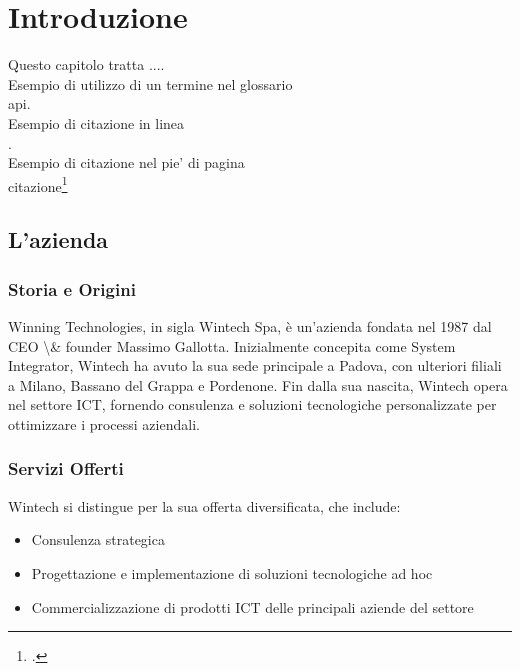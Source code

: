 \chapter{Introduzione}
\label{cap:introduzione}

Questo capitolo tratta ....\\

\noindent Esempio di utilizzo di un termine nel glossario \\
\gls{api}. \\

\noindent Esempio di citazione in linea \\
\cite{site:agile-manifesto}. \\

\noindent Esempio di citazione nel pie' di pagina \\
citazione\footcite{womak:lean-thinking} \\

\section{L'azienda}

\subsection{Storia e Origini}
Winning Technologies, in sigla Wintech Spa, è un'azienda fondata nel 1987 dal \gls{CEO \& founder} Massimo Gallotta. Inizialmente concepita come \gls{System Integrator}, Wintech ha avuto la sua sede principale a Padova, con ulteriori filiali a Milano, Bassano del Grappa e Pordenone. 
Fin dalla sua nascita, Wintech opera nel settore ICT, fornendo consulenza e soluzioni tecnologiche personalizzate per ottimizzare i processi aziendali.

\subsection{Servizi Offerti}
Wintech si distingue per la sua offerta diversificata, che include:

\begin{itemize}
    \item Consulenza strategica
    \item Progettazione e implementazione di soluzioni tecnologiche ad hoc
    \item Commercializzazione di prodotti ICT delle principali aziende del settore
\end{itemize}

